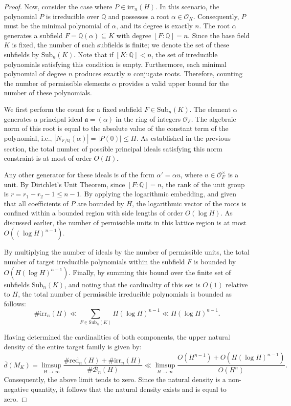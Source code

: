 \documentclass[11pt,a4paper]{article}
\newcommand{\Q}{\mathbb{Q}}
\newcommand{\OK}{\mathcal{O}_K}
\newcommand{\OF}{\mathcal{O}_F}
\begin{document}
\begin{proof}
Now, consider the case where $P \in \mathrm{irr}_n(H)$. In this scenario, the polynomial $P$ is irreducible over $\Q$ and possesses a root $\alpha \in \OK$. Consequently, $P$ must be the minimal polynomial of $\alpha$, and its degree is exactly $n$. The root $\alpha$ generates a subfield $F = \Q(\alpha) \subseteq K$ with degree $[F:\Q] = n$. Since the base field $K$ is fixed, the number of such subfields is finite; we denote the set of these subfields by $\mathrm{Sub}_n(K)$. Note that if $[K:\Q] < n$, the set of irreducible polynomials satisfying this condition is empty. Furthermore, each minimal polynomial of degree $n$ produces exactly $n$ conjugate roots. Therefore, counting the number of permissible elements $\alpha$ provides a valid upper bound for the number of these polynomials.

We first perform the count for a fixed subfield $F \in \mathrm{Sub}_n(K)$. The element $\alpha$ generates a principal ideal $\mathfrak{a} = (\alpha)$ in the ring of integers $\OF$. The algebraic norm of this root is equal to the absolute value of the constant term of the polynomial, i.e., $|N_{F/\Q}(\alpha)| = |P(0)| \le H$. As established in the previous section, the total number of possible principal ideals satisfying this norm constraint is at most of order $O(H)$.

Any other generator for these ideals is of the form $\alpha' = \alpha u$, where $u \in \OF^\times$ is a unit. By Dirichlet's Unit Theorem, since $[F:\Q] = n$, the rank of the unit group is $r = r_1 + r_2 - 1 \le n - 1$. By applying the logarithmic embedding, and given that all coefficients of $P$ are bounded by $H$, the logarithmic vector of the roots is confined within a bounded region with side lengths of order $O(\log H)$. As discussed earlier, the number of permissible units in this lattice region is at most $O((\log H)^{n-1})$.

By multiplying the number of ideals by the number of permissible units, the total number of target irreducible polynomials within the subfield $F$ is bounded by $O(H(\log H)^{n-1})$. Finally, by summing this bound over the finite set of subfields $\mathrm{Sub}_n(K)$, and noting that the cardinality of this set is $O(1)$ relative to $H$, the total number of permissible irreducible polynomials is bounded as follows:
\begin{equation*}
    \#\mathrm{irr}_n(H) \ll \sum_{F \in \mathrm{Sub}_n(K)} H(\log H)^{n-1} \ll H(\log H)^{n-1}.
\end{equation*}

Having determined the cardinalities of both components, the upper natural density of the entire target family is given by:
\begin{equation*}
    \overline{d}(M_K) = \limsup_{H \to \infty} \frac{\#\mathrm{red}_n(H) + \#\mathrm{irr}_n(H)}{\#\mathcal{B}_n(H)} \ll \limsup_{H \to \infty} \frac{O(H^{n-1}) + O(H(\log H)^{n-1})}{O(H^n)}.
\end{equation*}
Consequently, the above limit tends to zero. Since the natural density is a non-negative quantity, it follows that the natural density exists and is equal to zero.
\end{proof}
\end{document}
